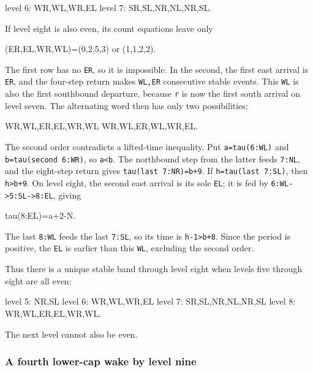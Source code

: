 \documentclass[11pt,letterpaper]{article}
\theoremstyle{plain}
\theoremstyle{definition}
\begin{document}
\begin{NoHyper}
\begin{codeblock}
level 6: WR,WL,WR,EL
level 7: SR,SL,NR,NL,NR,SL.
\end{codeblock}

If level eight is also even, its count equations leave only

\begin{codeblock}
(ER,EL,WR,WL)=(0,2,5,3) or (1,1,2,2).
\end{codeblock}

The first row has no \texttt{ER}, so it is impossible. In the second, the first east arrival is \texttt{ER}, and the four-step return makes \texttt{WL,ER} consecutive stable events. This \texttt{WL} is also the first southbound departure, because \texttt{r} is now the first south arrival on level seven. The alternating word then has only two possibilities:

\begin{codeblock}
WR,WL,ER,EL,WR,WL
WR,WL,ER,WL,WR,EL.
\end{codeblock}

The second order contradicts a lifted-time inequality. Put \texttt{a=tau(6:WL)} and \texttt{b=tau(second\ 6:WR)}, so \texttt{a\textless{}b}. The northbound step from the latter feeds \texttt{7:NL}, and the eight-step return gives \texttt{tau(last\ 7:NR)=b+9}. If \texttt{h=tau(last\ 7:SL)}, then \texttt{h\textgreater{}b+9}. On level eight, the second east arrival is its sole \texttt{EL}; it is fed by \texttt{6:WL-\textgreater{}5:SL-\textgreater{}8:EL}, giving

\begin{codeblock}
tau(8:EL)=a+2-N.
\end{codeblock}

The last \texttt{8:WL} feeds the last \texttt{7:SL}, so its time is \texttt{h-1\textgreater{}b+8}. Since the period is positive, the \texttt{EL} is earlier than this \texttt{WL}, excluding the second order.

Thus there is a unique stable band through level eight when levels five through eight are all even:

\begin{codeblock}
level 5: NR,SL
level 6: WR,WL,WR,EL
level 7: SR,SL,NR,NL,NR,SL
level 8: WR,WL,ER,EL,WR,WL.
\end{codeblock}

The next level cannot also be even.

\subsubsection{A fourth lower-cap wake by level nine}


\end{NoHyper}
\end{document}
